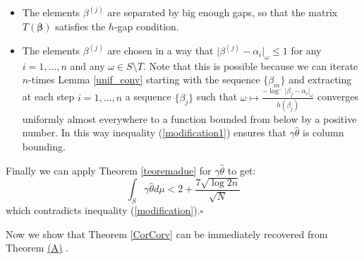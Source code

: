 \documentclass[10 pt,a4paper]{article}
\theoremstyle{plain}
\theoremstyle{definition}
\theoremstyle{named}
\newcommand\bref[3][blue]{%
    \begingroup%
    \hypersetup{linkcolor=#1}%
    \hyperlink{#2}{#3}%
    \endgroup}
\begin{document}
\begin{itemize}
\item The elements $\beta^{(j)}$ are separated by big enough gaps, so that the matrix $T(\bm\beta)$ satisfies the $h$-gap condition.

\item  The elements $\beta^{(j)}$ are chosen in a way that $\vert \beta^{(j)}-\alpha_i\vert_\omega \le 1$ for any $i=1,\ldots, n$ and any $\omega\in S\setminus T$. Note that this is possible because we can iterate $n$-times Lemma \ref{unif_conv} starting with the sequence $\{\beta_m\}$ and extracting at each step $i=1,\ldots,n$ a sequence $\{\beta_j\}$ such that $\omega\mapsto\frac{-\log^-\vert\beta_j-\alpha_i\vert_\omega}{h(\beta_j)}$  converges uniformly almost everywhere to a function bounded from below by a positive number. In this way inequality (\ref{modification1}) ensures that $\gamma\hat\theta$ is column bounding.
\end{itemize}

Finally we can apply Theorem \ref{teoremadue} for $\gamma\hat\theta$  to get:
$$
\int_{ S}\gamma \hat\theta d \mu<2+\frac{7\sqrt{\log 2n}}{\sqrt{N}}
$$
which  contradicts inequality (\ref{modification}).\hfill{$\square$}


\vspace{1ex}
Now we show that Theorem \ref{CorCorv} can be immediately recovered from Theorem \bref{thm:main}{(A)}.
\end{document}
